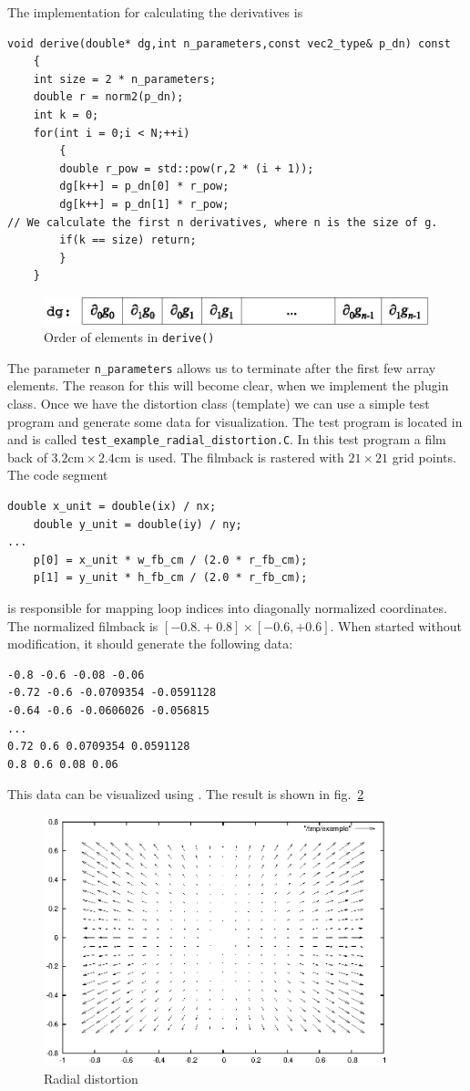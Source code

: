 \documentclass[10pt,a4paper]{article}
\begin{document}
The implementation for calculating the derivatives is
\begin{lstlisting}[language=mycpp,tabsize=8]
void derive(double* dg,int n_parameters,const vec2_type& p_dn) const
	{
	int size = 2 * n_parameters;
	double r = norm2(p_dn);
	int k = 0;
	for(int i = 0;i < N;++i)
		{
		double r_pow = std::pow(r,2 * (i + 1));
		dg[k++] = p_dn[0] * r_pow;
		dg[k++] = p_dn[1] * r_pow;
// We calculate the first n derivatives, where n is the size of g.
		if(k == size) return;
		}
	}
\end{lstlisting}
%
\begin{figure}[ht]
\centering
\includegraphics{derivatives}
\caption{Order of elements in {\tt derive()}}
\label{fig:Derivatives}
\end{figure}
%
The parameter {\tt n\_parameters} allows us to terminate
after the first few array elements. The reason for this will become clear, when
we implement the plugin class. Once we have the distortion class (template)
we can use a simple test program and generate some data for visualization.
The test program is located in  and is called
{\tt test\_example\_radial\_distortion.C}.
In this test program a film back of $3.2\mathrm{cm}\times2.4\mathrm{cm}$
is used. The filmback is rastered with $21\times21$ grid points.
The code segment
\begin{lstlisting}[language=mycpp,tabsize=8]
	double x_unit = double(ix) / nx;
	double y_unit = double(iy) / ny;
...
	p[0] = x_unit * w_fb_cm / (2.0 * r_fb_cm);
	p[1] = y_unit * h_fb_cm / (2.0 * r_fb_cm);
\end{lstlisting}
is responsible for mapping loop indices into diagonally normalized coordinates.
The normalized filmback is $[-0.8.+0.8]\times[-0.6,+0.6]$.
When started without modification,
it should generate the following data:
\begin{verbatim}
-0.8 -0.6 -0.08 -0.06
-0.72 -0.6 -0.0709354 -0.0591128
-0.64 -0.6 -0.0606026 -0.056815
...
0.72 0.6 0.0709354 0.0591128
0.8 0.6 0.08 0.06
\end{verbatim}
This data can be visualized using \gnuplot. The result is shown in
fig.~\ref{fig:ExampleRadialDistortion}
\begin{figure}[ht]
\centering
\includegraphics[width=10cm]{example_radial_distortion}
\caption{Radial distortion}
\label{fig:ExampleRadialDistortion}
\end{figure}
\end{document}
